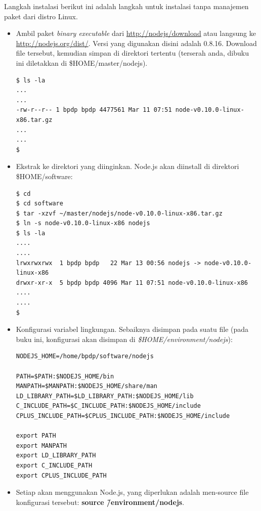Langkah instalasi berikut ini adalah langkah untuk instalasi tanpa manajemen paket dari distro Linux.
\begin{itemize}
  \item Ambil paket \textit{binary executable} dari \url{http://nodejs/download} atau langsung ke \url{http://nodejs.org/dist/}. Versi yang digunakan disini adalah 0.8.16. Download file tersebut, kemudian simpan di direktori tertentu (terserah anda, dibuku ini diletakkan di \$HOME/master/nodejs).

\lstset{language=bash,caption=Hasil dari download Node.js}
\begin{lstlisting}
$ ls -la
...
...
-rw-r--r-- 1 bpdp bpdp 4477561 Mar 11 07:51 node-v0.10.0-linux-x86.tar.gz
...
...
$ 
\end{lstlisting}

  \item Ekstrak ke direktori yang diinginkan. Node.js akan diinstall di direktori \$HOME/software:

\lstset{language=bash,caption=Ekstraksi Node.js}
\begin{lstlisting}
$ cd 
$ cd software
$ tar -xzvf ~/master/nodejs/node-v0.10.0-linux-x86.tar.gz
$ ln -s node-v0.10.0-linux-x86 nodejs
$ ls -la
....
....
lrwxrwxrwx  1 bpdp bpdp   22 Mar 13 00:56 nodejs -> node-v0.10.0-linux-x86
drwxr-xr-x  5 bpdp bpdp 4096 Mar 11 07:51 node-v0.10.0-linux-x86
....
....
$ 
\end{lstlisting}

  \item Konfigurasi variabel lingkungan. Sebaiknya disimpan pada suatu file (pada buku ini, konfigurasi akan disimpan di \textit{\$HOME/environment/nodejs}):

\lstset{language=bash,caption=Konfigurasi variabel lingkungan Node.js}
\begin{lstlisting}
NODEJS_HOME=/home/bpdp/software/nodejs
 
PATH=$PATH:$NODEJS_HOME/bin
MANPATH=$MANPATH:$NODEJS_HOME/share/man
LD_LIBRARY_PATH=$LD_LIBRARY_PATH:$NODEJS_HOME/lib
C_INCLUDE_PATH=$C_INCLUDE_PATH:$NODEJS_HOME/include
CPLUS_INCLUDE_PATH=$CPLUS_INCLUDE_PATH:$NODEJS_HOME/include
 
export PATH
export MANPATH
export LD_LIBRARY_PATH
export C_INCLUDE_PATH
export CPLUS_INCLUDE_PATH
\end{lstlisting}

  \item Setiap akan menggunakan Node.js, yang diperlukan adalah men-source file konfigurasi tersebut: \textbf{source \~/environment/nodejs}.
\end{itemize}

